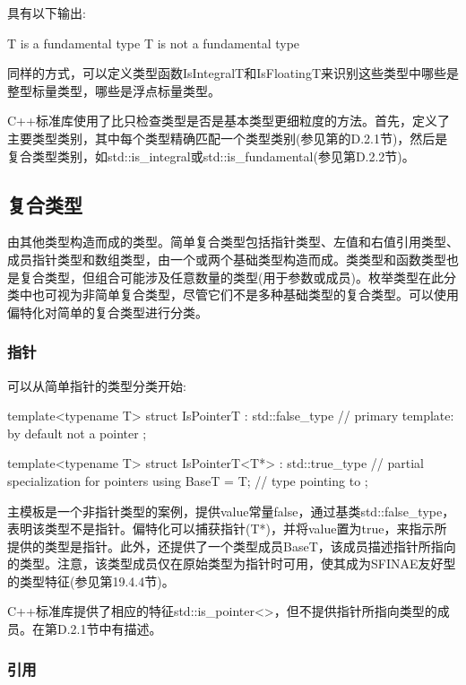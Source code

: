 具有以下输出:

\begin{shell}
T is a fundamental type
T is not a fundamental type
\end{shell}

同样的方式，可以定义类型函数IsIntegralT和IsFloatingT来识别这些类型中哪些是整型标量类型，哪些是浮点标量类型。

C++标准库使用了比只检查类型是否是基本类型更细粒度的方法。首先，定义了主要类型类别，其中每个类型精确匹配一个类型类别(参见第的D.2.1节)，然后是复合类型类别，如std::is\_integral或std::is\_fundamental(参见第D.2.2节)。

\subsection{复合类型}

由其他类型构造而成的类型。简单复合类型包括指针类型、左值和右值引用类型、成员指针类型和数组类型，由一个或两个基础类型构造而成。类类型和函数类型也是复合类型，但组合可能涉及任意数量的类型(用于参数或成员)。枚举类型在此分类中也可视为非简单复合类型，尽管它们不是多种基础类型的复合类型。可以使用偏特化对简单的复合类型进行分类。

\subsubsection{指针}

可以从简单指针的类型分类开始:

\begin{cpp}
template<typename T>
struct IsPointerT : std::false_type { // primary template: by default not a pointer
};

template<typename T>
struct IsPointerT<T*> : std::true_type { // partial specialization for pointers
	using BaseT = T; // type pointing to
};
\end{cpp}

主模板是一个非指针类型的案例，提供value常量false，通过基类std::false\_type，表明该类型不是指针。偏特化可以捕获指针(T*)，并将value置为true，来指示所提供的类型是指针。此外，还提供了一个类型成员BaseT，该成员描述指针所指向的类型。注意，该类型成员仅在原始类型为指针时可用，使其成为SFINAE友好型的类型特征(参见第19.4.4节)。

C++标准库提供了相应的特征std::is\_pointer<>，但不提供指针所指向类型的成员。在第D.2.1节中有描述。

\subsubsection{引用}

